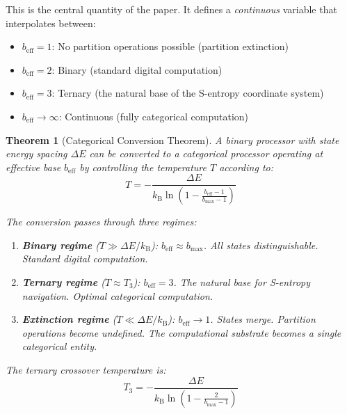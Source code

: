 \documentclass[twocolumn,10pt]{article}
\newtheorem{theorem}{Theorem}[section]
\theoremstyle{remark}
\newcommand{\kB}{k_{\mathrm{B}}}
\begin{document}
This is the central quantity of the paper. It defines a \emph{continuous} variable that interpolates between:
\begin{itemize}
    \item $b_{\text{eff}} = 1$: No partition operations possible (partition extinction)
    \item $b_{\text{eff}} = 2$: Binary (standard digital computation)
    \item $b_{\text{eff}} = 3$: Ternary (the natural base of the S-entropy coordinate system)
    \item $b_{\text{eff}} \to \infty$: Continuous (fully categorical computation)
\end{itemize}

\begin{theorem}[Categorical Conversion Theorem]
\label{thm:categorical_conversion}
A binary processor with state energy spacing $\Delta E$ can be converted to a categorical processor operating at effective base $b_{\text{eff}}$ by controlling the temperature $T$ according to:
\begin{equation}
    T = -\frac{\Delta E}{\kB \ln\left(1 - \frac{b_{\text{eff}} - 1}{b_{\max} - 1}\right)}
\end{equation}

The conversion passes through three regimes:
\begin{enumerate}
    \item \textbf{Binary regime} ($T \gg \Delta E / \kB$): $b_{\text{eff}} \approx b_{\max}$. All states distinguishable. Standard digital computation.
    \item \textbf{Ternary regime} ($T \approx T_3$): $b_{\text{eff}} = 3$. The natural base for S-entropy navigation. Optimal categorical computation.
    \item \textbf{Extinction regime} ($T \ll \Delta E / \kB$): $b_{\text{eff}} \to 1$. States merge. Partition operations become undefined. The computational substrate becomes a single categorical entity.
\end{enumerate}

The ternary crossover temperature is:
\begin{equation}
    T_3 = -\frac{\Delta E}{\kB \ln\left(1 - \frac{2}{b_{\max} - 1}\right)}
\end{equation}
\end{theorem}
\end{document}
